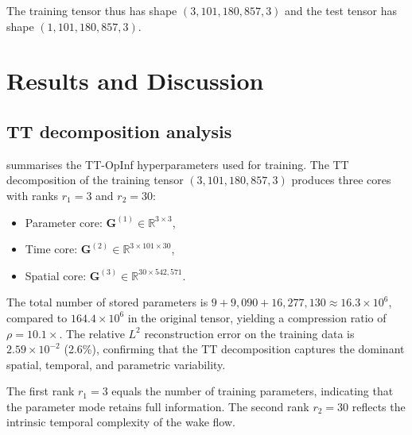 \documentclass[12pt]{article}
\newcommand{\R}{\mathbb{R}}
\newcommand{\mat}[1]{\mathbf{#1}}
\begin{document}
The training tensor thus has shape $(3, 101, 180{,}857, 3)$ and the test tensor has shape $(1, 101, 180{,}857, 3)$.


\section{Results and Discussion}
\label{sec:results}

\subsection{TT decomposition analysis}
\label{sec:tt_results}

 summarises the TT-OpInf hyperparameters used for training.
The TT decomposition of the training tensor $(3, 101, 180{,}857, 3)$ produces three cores with ranks $r_1 = 3$ and $r_2 = 30$:
\begin{itemize}
    \item Parameter core: $\mat{G}^{(1)} \in \R^{3 \times 3}$,
    \item Time core: $\mat{G}^{(2)} \in \R^{3 \times 101 \times 30}$,
    \item Spatial core: $\mat{G}^{(3)} \in \R^{30 \times 542{,}571}$.
\end{itemize}

The total number of stored parameters is $9 + 9{,}090 + 16{,}277{,}130 \approx 16.3 \times 10^6$, compared to $164.4 \times 10^6$ in the original tensor, yielding a compression ratio of $\rho = 10.1\times$.
The relative $L^2$ reconstruction error on the training data is $2.59 \times 10^{-2}$ (2.6\%), confirming that the TT decomposition captures the dominant spatial, temporal, and parametric variability.

The first rank $r_1 = 3$ equals the number of training parameters, indicating that the parameter mode retains full information.
The second rank $r_2 = 30$ reflects the intrinsic temporal complexity of the wake flow.
\end{document}
